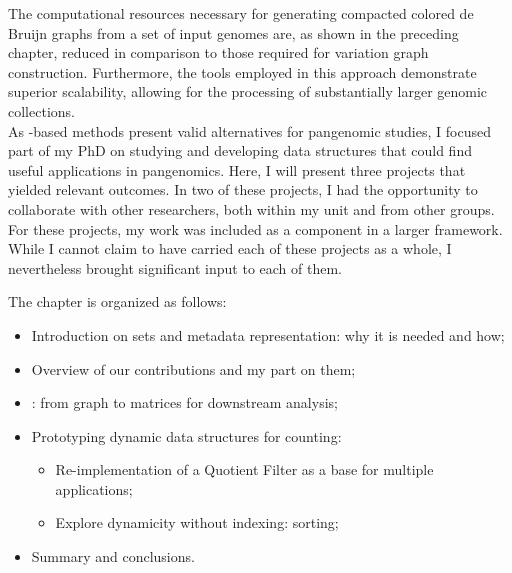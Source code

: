 The computational resources necessary for generating compacted colored de Bruijn graphs from a set of input genomes are, as shown in the preceding chapter, reduced in comparison to those required for variation graph construction. Furthermore, the tools employed in this approach demonstrate superior scalability, allowing for the processing of substantially larger genomic collections.\\
As \kmer-based methods present valid alternatives for pangenomic studies, I focused part of my PhD on studying and developing data structures that could find useful applications in pangenomics. Here, I will present three projects that yielded relevant outcomes. In two of these projects, I had the opportunity to collaborate with other researchers, both within my unit and from other groups. For these projects, my work was included as a component in a larger framework. While I cannot claim to have carried each of these projects as a whole, I nevertheless brought significant input to each of them.

The chapter is organized as follows:
\begin{itemize}
	\item Introduction on \kmer sets and metadata representation: why it is needed and how;
	\item Overview of our contributions and my part on them;
	\item \muset: from graph to matrices for downstream analysis;
	\item Prototyping dynamic data structures for \kmer counting:
	\begin{itemize}
		\item Re-implementation of a Quotient Filter as a base for multiple applications;
		\item Explore dynamicity without indexing: \skmer sorting;
	\end{itemize}
	\item Summary and conclusions.
\end{itemize}

